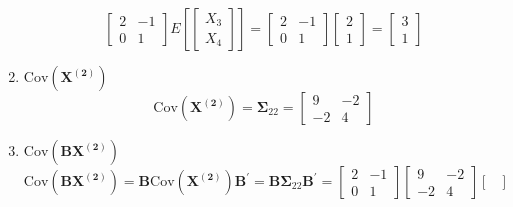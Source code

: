 \begin{enumerate}[label=(\alph*)]
\[\begin{bmatrix}
                    2 & -1 \\
                    0 & 1
                \end{bmatrix}
                E\left[
                    \begin{bmatrix}
                        X_3 \\
                        X_4
                    \end{bmatrix}
                \right]
                =
                \begin{bmatrix}
                    2 & -1 \\
                    0 & 1
                \end{bmatrix}
                \begin{bmatrix}
                    2 \\
                    1
                \end{bmatrix}
                =
                \begin{bmatrix}
                    3 \\
                    1
                \end{bmatrix}
            \]
            \item $\text{Cov}\left(\mathbf{X^{(2)}}\right)$
            \[
                \text{Cov}\left(\mathbf{X^{(2)}}\right)
                =
                \mathbf{\Sigma}_{22}
                =
                \begin{bmatrix}
                    9 & -2 \\
                    -2 & 4
                \end{bmatrix}
            \]
            \item $\text{Cov}\left(\mathbf{B}\mathbf{X^{(2)}}\right)$
            \[
                \text{Cov}\left(\mathbf{B}\mathbf{X^{(2)}}\right)
                =
                \mathbf{B}\text{Cov}\left(\mathbf{X^{(2)}}\right)\mathbf{B}^\prime
                =
                \mathbf{B}\mathbf{\Sigma}_{22}\mathbf{B}^\prime
                =
                \begin{bmatrix}
                    2 & -1 \\
                    0 & 1
                \end{bmatrix}
                \begin{bmatrix}
                    9 & -2 \\
                    -2 & 4
                \end{bmatrix}
                \begin{bmatrix}

\end{bmatrix}\]
\end{enumerate}
